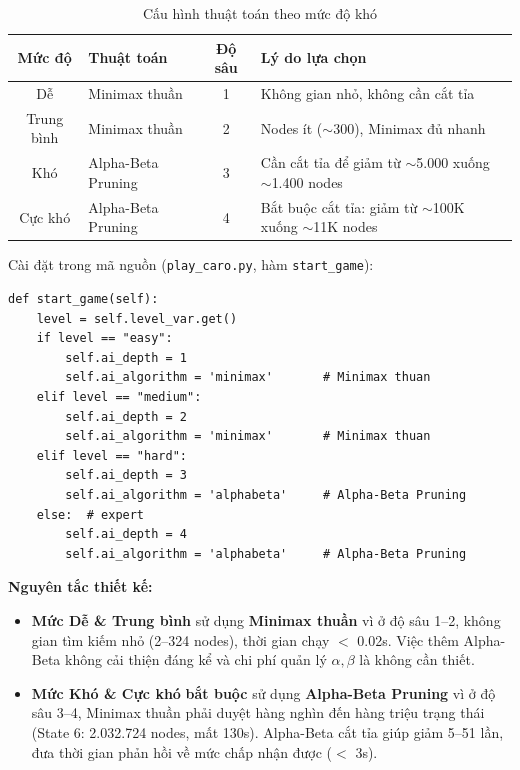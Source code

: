 \documentclass[12pt,a4paper]{article}
\begin{document}
\begin{table}[H]
\centering
\caption{Cấu hình thuật toán theo mức độ khó}
\begin{tabular}{clcl}
\toprule
\textbf{Mức độ} & \textbf{Thuật toán} & \textbf{Độ sâu} & \textbf{Lý do lựa chọn} \\
\midrule
Dễ         & Minimax thuần       & 1 & Không gian nhỏ, không cần cắt tỉa \\
Trung bình & Minimax thuần       & 2 & Nodes ít ($\sim$300), Minimax đủ nhanh \\
Khó        & Alpha-Beta Pruning  & 3 & Cần cắt tỉa để giảm từ $\sim$5.000 xuống $\sim$1.400 nodes \\
Cực khó    & Alpha-Beta Pruning  & 4 & Bắt buộc cắt tỉa: giảm từ $\sim$100K xuống $\sim$11K nodes \\
\bottomrule
\end{tabular}
\end{table}

Cài đặt trong mã nguồn (\texttt{play\_caro.py}, hàm \texttt{start\_game}):

\begin{lstlisting}[caption={Lựa chọn thuật toán theo mức độ khó}]
def start_game(self):
    level = self.level_var.get()
    if level == "easy":
        self.ai_depth = 1
        self.ai_algorithm = 'minimax'       # Minimax thuan
    elif level == "medium":
        self.ai_depth = 2
        self.ai_algorithm = 'minimax'       # Minimax thuan
    elif level == "hard":
        self.ai_depth = 3
        self.ai_algorithm = 'alphabeta'     # Alpha-Beta Pruning
    else:  # expert
        self.ai_depth = 4
        self.ai_algorithm = 'alphabeta'     # Alpha-Beta Pruning
\end{lstlisting}

\textbf{Nguyên tắc thiết kế:}
\begin{itemize}
    \item \textbf{Mức Dễ \& Trung bình} sử dụng \textbf{Minimax thuần} vì ở độ sâu 1--2, không gian tìm kiếm nhỏ (2--324 nodes), thời gian chạy $<$ 0.02s. Việc thêm Alpha-Beta không cải thiện đáng kể và chi phí quản lý $\alpha, \beta$ là không cần thiết.
    \item \textbf{Mức Khó \& Cực khó} \textbf{bắt buộc} sử dụng \textbf{Alpha-Beta Pruning} vì ở độ sâu 3--4, Minimax thuần phải duyệt hàng nghìn đến hàng triệu trạng thái (State 6: 2.032.724 nodes, mất 130s). Alpha-Beta cắt tỉa giúp giảm 5--51 lần, đưa thời gian phản hồi về mức chấp nhận được ($<$ 3s).
\end{itemize}
\end{document}

